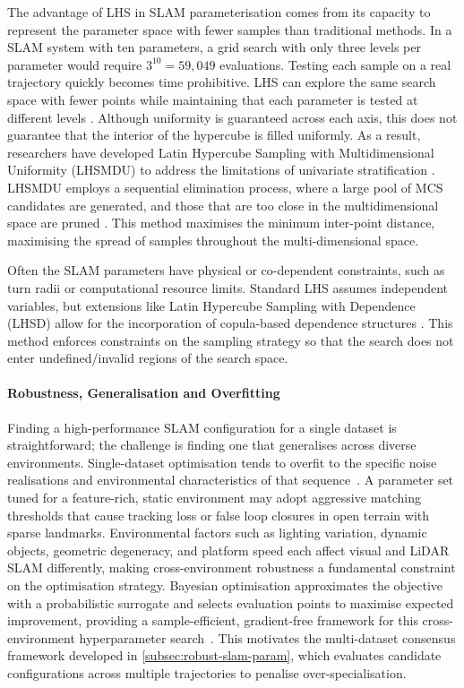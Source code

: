The advantage of LHS in SLAM parameterisation comes from its capacity to represent the parameter space with fewer samples than traditional methods. In a SLAM system with ten parameters, a grid search with only three levels per parameter would require $3^{10} = 59,049$ evaluations. Testing each sample on a real trajectory quickly becomes time prohibitive. LHS can explore the same search space with fewer points while maintaining that each parameter is tested at different levels \cite{deutschLatinHypercubeSampling2012}. Although uniformity is guaranteed across each axis, this does not guarantee that the interior of the hypercube is filled uniformly. As a result, researchers have developed Latin Hypercube Sampling with Multidimensional Uniformity (LHSMDU) to address the limitations of univariate stratification \cite{deutschLatinHypercubeSampling2012}. LHSMDU employs a sequential elimination process, where a large pool of MCS candidates are generated, and those that are too close in the multidimensional space are pruned \cite{deutschLatinHypercubeSampling2012}. This method maximises the minimum inter-point distance, maximising the spread of samples throughout the multi-dimensional space.

Often the SLAM parameters have physical or co-dependent constraints, such as turn radii or computational resource limits.
Standard LHS assumes independent variables, but extensions like Latin Hypercube Sampling with Dependence (LHSD) allow for the incorporation of copula-based dependence structures \cite{packhamLatinHypercubeSampling2008}. This method enforces constraints on the sampling strategy so that the search does not enter undefined/invalid regions of the search space. 

\paragraph{Robustness, Generalisation and Overfitting}
Finding a high-performance SLAM configuration for a single dataset is straightforward; the challenge is finding one that generalises across diverse environments. Single-dataset optimisation tends to overfit to the specific noise realisations and environmental characteristics of that sequence~\cite{koideAdaptiveHyperparameter2021}. A parameter set tuned for a feature-rich, static environment may adopt aggressive matching thresholds that cause tracking loss or false loop closures in open terrain with sparse landmarks. Environmental factors such as lighting variation, dynamic objects, geometric degeneracy, and platform speed each affect visual and LiDAR SLAM differently, making cross-environment robustness a fundamental constraint on the optimisation strategy. Bayesian optimisation approximates the objective with a probabilistic surrogate and selects evaluation points to maximise expected improvement, providing a sample-efficient, gradient-free framework for this cross-environment hyperparameter search~\cite{kandasamyTuningHyperparametersGrad}. This motivates the multi-dataset consensus framework developed in \cref{subsec:robust-slam-param}, which evaluates candidate configurations across multiple trajectories to penalise over-specialisation.
